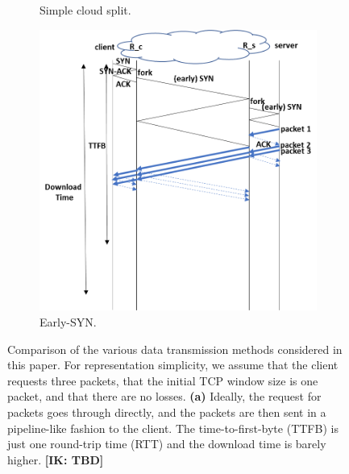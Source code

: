 \documentclass[10pt,sigconf]{acmart}
\newcommand{\mycomm}[3]{{\color{#2} \textbf{[#1: #3]}}}
\newcommand{\mycomm}[3]{}
\newcommand{\IK}[1]{\mycomm{IK}{blue}{#1}}
\begin{document}
\begin{figure}[t]
\begin{subfigure}{0.6\columnwidth}
    \caption{Simple cloud split.} \label{fig:split}
\end{subfigure}
 \centering
\begin{subfigure}{0.6\columnwidth}
  \centering
  \includegraphics[width=\columnwidth]{figures/early-syn.png}
    \caption{Early-SYN.} \label{fig:split}
\end{subfigure}
    \caption{Comparison of the various data transmission methods considered in this paper. For representation simplicity, we assume that the client requests three packets, that the initial TCP window size is one packet, and that there are no losses. \textbf{(a)} Ideally, the request for packets goes through directly, and the packets are then sent in a pipeline-like fashion to the client. The time-to-first-byte (TTFB) is just one round-trip time (RTT) and the download time is barely higher. \IK{TBD} }
\end{figure}


\end{document}
